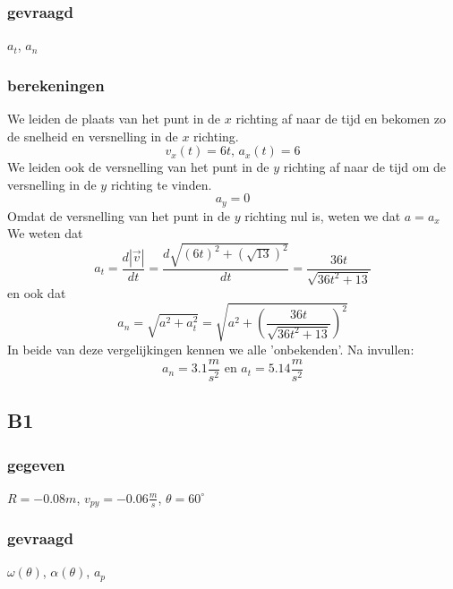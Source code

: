 \documentclass[10pt,a4paper]{article}
\begin{document}
\subsubsection*{gevraagd}
$a_{t}$, $a_{n}$
\subsubsection*{berekeningen}
We leiden de plaats van het punt in de $x$ richting af naar de tijd en bekomen zo de snelheid en versnelling in de $x$ richting.
\[v_{x}(t)=6t\text{, }a_{x}(t) = 6\]
We leiden ook de versnelling van het punt in de $y$ richting af naar de tijd om de versnelling in de $y$ richting te vinden.
\[
a_{y} = 0
\]
Omdat de versnelling van het punt in de $y$ richting nul is, weten we dat $a = a_{x}$
\\We weten dat
\[
a_{t} = \frac{d|\vec{v}|}{dt} = \frac{d\sqrt{(6t)^{2} + (\sqrt{13})^{2}}}{dt} = \frac{36t}{\sqrt{36t^{2}+13}}
\]
en ook dat
\[
a_{n} = \sqrt{a^{2} + a_{t}^{2}} = \sqrt{a^{2} + \left(\frac{36t}{\sqrt{36t^{2}+13}}\right)^{2}}
\]
In beide van deze vergelijkingen kennen we alle 'onbekenden'. Na invullen:
\[
a_{n} = 3.1\frac{m}{s^{2}} \text{ en } a_{t} = 5.14\frac{m}{s^{2}}
\]

\subsection{B1}
\subsubsection*{gegeven}
$R=-0.08m$, $v_{py} = -0.06 \frac{m}{s}$, $\theta = 60^\circ$
\subsubsection*{gevraagd}
$\omega(\theta)$, $\alpha(\theta)$, $a_{p}$
\end{document}
